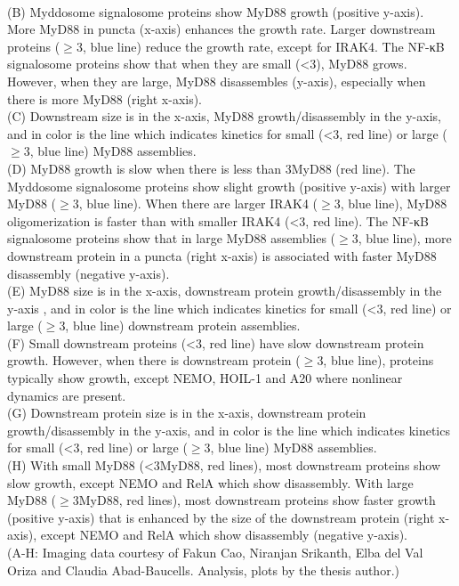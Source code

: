 \begin{centering}
{\vspace{1em}
\\
(B) Myddosome signalosome proteins show MyD88 growth (positive y-axis). More MyD88 in puncta (x-axis) enhances the growth rate. Larger downstream proteins ($\geq$3\times, blue line) reduce the growth rate, except for IRAK4. The NF-κB signalosome proteins show that when they are small (<3\times), MyD88 grows. However, when they are large, MyD88 disassembles (y-axis), especially when there is more MyD88 (right x-axis).
\vspace{1em}
\\
(C) Downstream size is in the x-axis, MyD88 growth/disassembly in the y-axis, and in color is the line which indicates kinetics for small (<3\times, red line) or large ($\geq$3\times, blue line) MyD88 assemblies.
\vspace{1em}
\\
(D) MyD88 growth is slow when there is less than 3\times MyD88 (red line). The Myddosome signalosome proteins show slight growth (positive y-axis) with larger MyD88 ($\geq$3\times, blue line). When there are larger IRAK4 ($\geq$3\times, blue line), MyD88 oligomerization is faster than with smaller IRAK4 (<3\times, red line). The NF-κB signalosome proteins show that in large MyD88 assemblies ($\geq$3\times, blue line), more downstream protein in a puncta (right x-axis) is associated with faster MyD88 disassembly (negative y-axis). 
\vspace{1em}
\\
(E) MyD88 size is in the x-axis, downstream protein growth/disassembly in the y-axis , and in color is the line which indicates kinetics for small (<3\times, red line) or large ($\geq$3\times, blue line) downstream protein assemblies.
\vspace{1em}
\\
(F) Small downstream proteins (<3\times, red line) have slow downstream protein growth. However, when there is downstream protein ($\geq$3\times, blue line), proteins typically show growth, except NEMO, HOIL-1 and A20 where nonlinear dynamics are present. 
\vspace{1em}
\\
(G) Downstream protein size is in the x-axis, downstream protein growth/disassembly in the y-axis, and in color is the line which indicates kinetics for small (<3\times, red line) or large ($\geq$3\times, blue line) MyD88 assemblies.
\vspace{1em}
\\
(H) With small MyD88 (<3\times MyD88, red lines), most downstream proteins show slow growth, except NEMO and RelA which show disassembly. With large MyD88 ($\geq$3\times MyD88, red lines), most downstream proteins show faster growth (positive y-axis) that is enhanced by the size of the downstream protein (right x-axis), except NEMO and RelA which show disassembly (negative y-axis).
\vspace{1em}
\\
(A-H: Imaging data courtesy of Fakun Cao, Niranjan Srikanth, Elba del Val Oriza and Claudia Abad-Baucells. Analysis, plots by the thesis author.)}
\label{p2:S5}
\end{centering}

